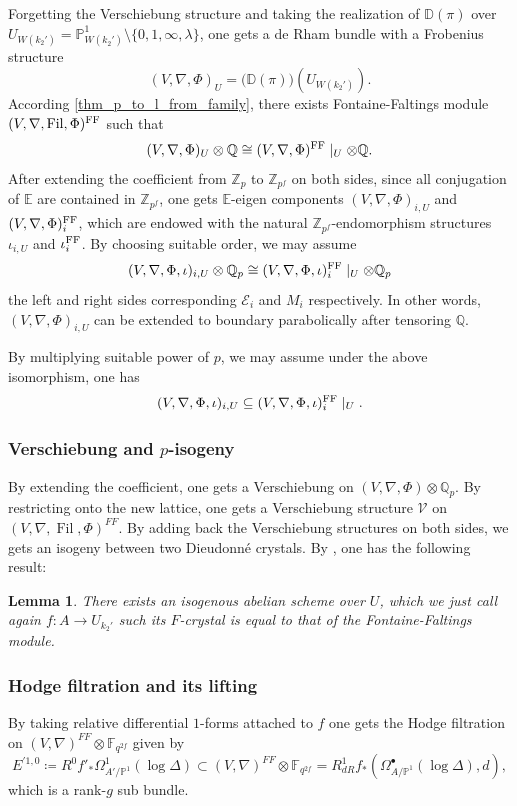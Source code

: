 \documentclass[12pt,twoside]{book}
\theoremstyle{plain}
\newtheorem{lemma}[lemma]{Lemma}
\theoremstyle{definition}
\theoremstyle{remark}
\newcommand{\bD}{{\mathbb D}}
\newcommand{\bF}{{\mathbb F}}
\newcommand{\bP}{{\mathbb P}}
\newcommand{\bQ}{{\mathbb Q}}
\newcommand{\bZ}{{\mathbb Z}}
\newcommand{\mE}{{\mathcal E}}
\newcommand{\mV}{{\mathcal V}}
\DeclareMathOperator\Fil{Fil}
\numberwithin{equation}{section}
\def\EK{{\mathbb E}}
\begin{document}
Forgetting the Verschiebung structure and taking the realization of $\bD(\pi)$ over $U_{W(k_2')}=\bP^1_{W(k_2')}\setminus\{0,1,\infty,\lambda\}$, one gets a de Rham bundle with a Frobenius structure
\[(V,\nabla,\Phi)_U= \Big(\bD(\pi)\Big)(U_{W(k_2')}).\]
According \autoref{thm_p_to_l_from_family}, there exists Fontaine-Faltings module $(V,\nabla,\Fil,\Phi)^{\rm FF}$ such that
\[(V,\nabla,\Phi)_U \otimes \bQ \cong (V,\nabla,\Phi)^{\rm FF} \mid_{U} \otimes \bQ.\]
After extending the coefficient from $\bZ_p$ to $\bZ_{p^f}$ on both sides, since all conjugation of $\EK$ are contained in $\bZ_{p^f}$, one gets $\EK$-eigen components $(V,\nabla,\Phi)_{i,U}$ and $(V,\nabla,\Phi)^{\rm FF}_{i}$, which are endowed with the natural $\bZ_{p^f}$-endomorphism structures $\iota_{i,U}$ and $\iota_i^{\rm FF}$. By choosing suitable order, we may assume
\[(V,\nabla,\Phi,\iota)_{i,U}\otimes \bQ_p \cong (V,\nabla,\Phi,\iota)^{\rm FF}_{i}\mid_{U} \otimes \bQ_p\]
the left and right sides corresponding $\mE_i$ and $M_i$ respectively. In other words, $(V,\nabla,\Phi)_{i,U}$ can be extended to boundary parabolically after tensoring $\bQ$.

By multiplying suitable power of $p$, we may assume under the above isomorphism, one has
\[(V,\nabla,\Phi,\iota)_{i,U} \subseteq (V,\nabla,\Phi,\iota)^{\rm FF}_{i}\mid_{U}.\]

\subsubsection{Verschiebung and $p$-isogeny}

By extending the coefficient, one gets a Verschiebung on $(V,\nabla,\Phi)\otimes \bQ_p$. By restricting onto the new lattice, one gets a Verschiebung structure $\mV$ on $(V,\nabla,\Fil,\Phi)^{FF}$. By adding back the Verschiebung structures on both sides, we gets an isogeny between two Dieudonn\'e crystals. By \cite[Lemma 2.13]{KrPa22}, one has the following result:
\begin{lemma}
There exists an isogenous abelian scheme over $U$, which we just call again $f: A\to U_{k_2'}$ such its $F$-crystal is equal to that of the Fontaine-Faltings module.
\end{lemma}

\subsubsection{Hodge filtration and its lifting}

By taking relative differential $1$-forms attached to $f$ one gets the Hodge filtration on $(V,\nabla)^{FF}\otimes \bF_{q^{2f}}$ given by
\[E^{'1,0}\coloneqq R^0f'_*\Omega^1 _{A'/\bP^1} (\log \Delta) \subset (V,\nabla)^{FF}\otimes \bF_{q^{2f}}=R^1_{dR}f_*(\Omega^\bullet_{A/\bP^1}(\log \Delta),d),\]
which is a rank-$g$ sub bundle.
\end{document}
